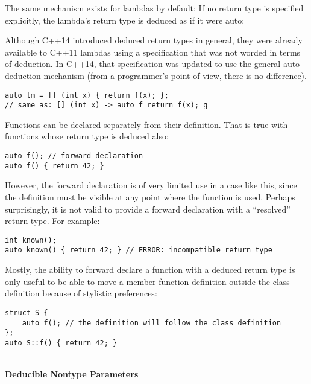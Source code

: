 The same mechanism exists for lambdas by default: If no return type is specified explicitly, the lambda’s return type is deduced as if it were auto:

\begin{tcolorbox}[colback=webgreen!5!white,colframe=webgreen!75!black]
\hspace*{0.75cm}Although C++14 introduced deduced return types in general, they were already available to C++11 lambdas using a specification that was not worded in terms of deduction. In C++14, that specification was updated to use the general auto deduction mechanism (from a programmer’s point of view, there is no difference).
\end{tcolorbox}

\begin{lstlisting}[style=styleCXX]
auto lm = [] (int x) { return f(x); };
// same as: [] (int x) -> auto f return f(x); g
\end{lstlisting}

Functions can be declared separately from their definition. That is true with functions whose return type is deduced also:

\begin{lstlisting}[style=styleCXX]
auto f(); // forward declaration
auto f() { return 42; }
\end{lstlisting}

However, the forward declaration is of very limited use in a case like this, since the definition must be visible at any point where the function is used. Perhaps surprisingly, it is not valid to provide a forward declaration with a “resolved” return type. For example:

\begin{lstlisting}[style=styleCXX]
int known();
auto known() { return 42; } // ERROR: incompatible return type
\end{lstlisting}

Mostly, the ability to forward declare a function with a deduced return type is only useful to be able to move a member function definition outside the class definition because of stylistic preferences:

\begin{lstlisting}[style=styleCXX]
struct S {
	auto f(); // the definition will follow the class definition
};
auto S::f() { return 42; }
\end{lstlisting}

\hspace*{\fill} \\ %
\noindent
\textbf{Deducible Nontype Parameters}

